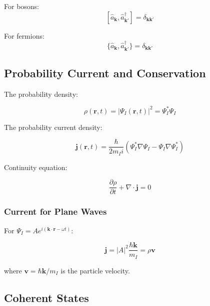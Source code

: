 For bosons:
\begin{equation}
\label{eq:boson_commutation}
[\hat{a}_\mathbf{k}, \hat{a}_{\mathbf{k}'}^\dagger] = \delta_{\mathbf{k}\mathbf{k}'}
\end{equation}

For fermions:
\begin{equation}
\label{eq:fermion_anticommutation}
\{\hat{a}_\mathbf{k}, \hat{a}_{\mathbf{k}'}^\dagger\} = \delta_{\mathbf{k}\mathbf{k}'}
\end{equation}

\subsection{Probability Current and Conservation}

The probability density:

\begin{equation}
\label{eq:probability_density}
\rho(\mathbf{r}, t) = |\Psi_I(\mathbf{r}, t)|^2 = \Psi_I^* \Psi_I
\end{equation}

The probability current density:

\begin{equation}
\label{eq:probability_current}
\mathbf{j}(\mathbf{r}, t) = \frac{\hbar}{2m_I i}(\Psi_I^*\nabla\Psi_I - \Psi_I\nabla\Psi_I^*)
\end{equation}

Continuity equation:

\begin{equation}
\label{eq:continuity}
\frac{\partial\rho}{\partial t} + \nabla \cdot \mathbf{j} = 0
\end{equation}

\subsubsection{Current for Plane Waves}

For $\Psi_I = A e^{i(\mathbf{k}\cdot\mathbf{r} - \omega t)}$:

\begin{equation}
\label{eq:plane_wave_current}
\mathbf{j} = |A|^2 \frac{\hbar\mathbf{k}}{m_I} = \rho \mathbf{v}
\end{equation}

where $\mathbf{v} = \hbar\mathbf{k}/m_I$ is the particle velocity.

\subsection{Coherent States}

